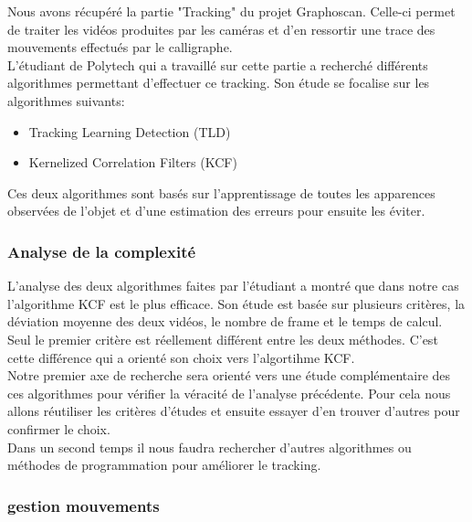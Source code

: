 Nous avons r\'ecup\'er\'e la partie "Tracking" du projet Graphoscan. Celle-ci permet de traiter les vid\'eos produites par les cam\'eras et d'en ressortir une trace des mouvements effectu\'es par le calligraphe. \\

L'\'etudiant de Polytech qui a travaill\'e sur cette partie a recherch\'e diff\'erents algorithmes permettant d'effectuer ce tracking. Son \'etude se focalise sur les algorithmes suivants:

\begin{itemize}

\item Tracking Learning Detection (TLD)

\item Kernelized Correlation Filters (KCF)

\end{itemize}

Ces deux algorithmes sont bas\'es sur l'apprentissage de toutes les apparences observ\'ees de l'objet et d'une estimation des erreurs pour ensuite les \'eviter.
  
\subsubsection{Analyse de la complexité}

L'analyse des deux algorithmes faites par l'\'etudiant a montr\'e que dans notre cas l'algorithme KCF est le plus efficace. Son \'etude est bas\'ee sur plusieurs crit\`eres, la d\'eviation moyenne des deux vid\'eos, le nombre de frame et le temps de calcul. Seul le premier critère est r\'eellement diff\'erent entre les deux m\'ethodes. C'est cette diff\'erence qui a orient\'e son choix vers l'algortihme KCF. \\

Notre premier axe de recherche sera orient\'e vers une \'etude compl\'ementaire des ces algorithmes pour v\'erifier la v\'eracit\'e de l'analyse pr\'ec\'edente. Pour cela nous allons r\'eutiliser les crit\`eres d'\'etudes et ensuite essayer d'en trouver d'autres pour confirmer le choix. \\

Dans un second temps il nous faudra rechercher d'autres algorithmes ou m\'ethodes de programmation pour am\'eliorer le tracking.

\subsubsection{gestion mouvements}

